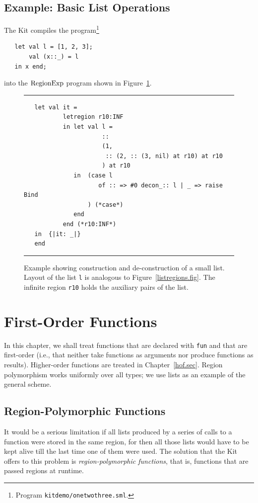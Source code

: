 \documentclass[12pt]{book}
\begin{document}
\section{Example: Basic List Operations}
\label{listexamples.sec}
The Kit compiles the program\footnote{Program \texttt{kitdemo/onetwothree.sml}.}  
\begin{verbatim}
   let val l = [1, 2, 3];
       val (x::_) = l
   in x end;
\end{verbatim}       
into the $\hbox{\rm RegionExp}$ program shown in Figure~\ref{listprint.fig}.
\begin{figure}
\hrule \medskip
\begin{verbatim}
   let val it = 
           letregion r10:INF 
           in let val l = 
                      :: 
                      (1, 
                       :: (2, :: (3, nil) at r10) at r10
                      ) at r10
              in  (case l 
                     of :: => #0 decon_:: l | _ => raise Bind
                  ) (*case*) 
              end  
           end (*r10:INF*)
   in  {|it: _|}
   end 
\end{verbatim}
\caption{Example showing construction and de-construction of a small list.
Layout of the list {\tt l} is analogous to Figure~\ref{listregions.fig}.
The infinite region {\tt r10} holds the auxiliary pairs of the list.
}
\label{listprint.fig}
\medskip

\hrule
\end{figure}


\chapter{First-Order Functions}
In this chapter, we shall treat
%
%
functions that are declared with 
{\tt fun} and that are first-order (i.e., that neither take functions
as arguments nor produce functions as results). Higher-order functions
are treated in Chapter~\ref{hof.sec}.  Region polymorphism works
uniformly over all types; we use lists as an example of the general
scheme.

\section{Region-Polymorphic Functions}
%
It would be a serious limitation if all lists produced by a series of
calls to a function were stored in the same region, for then all those
lists would have to be kept alive till the last time one of them were
used. The solution that the Kit offers to this problem is {\em
  region-polymorphic functions}, that is, functions that are passed
regions at runtime.
\end{document}
